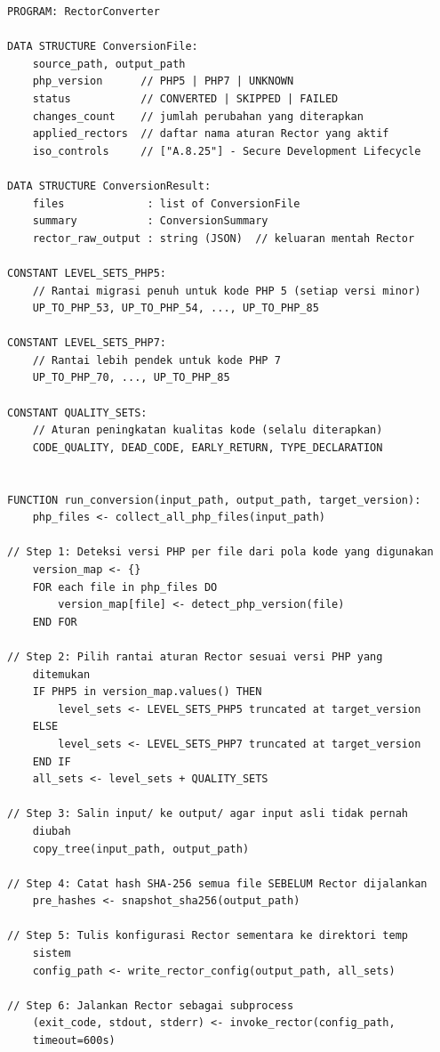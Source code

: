 \begin{lstlisting}[style=pseudocodestyle]
PROGRAM: RectorConverter

DATA STRUCTURE ConversionFile:
    source_path, output_path
    php_version      // PHP5 | PHP7 | UNKNOWN
    status           // CONVERTED | SKIPPED | FAILED
    changes_count    // jumlah perubahan yang diterapkan
    applied_rectors  // daftar nama aturan Rector yang aktif
    iso_controls     // ["A.8.25"] - Secure Development Lifecycle

DATA STRUCTURE ConversionResult:
    files             : list of ConversionFile
    summary           : ConversionSummary
    rector_raw_output : string (JSON)  // keluaran mentah Rector

CONSTANT LEVEL_SETS_PHP5:
    // Rantai migrasi penuh untuk kode PHP 5 (setiap versi minor)
    UP_TO_PHP_53, UP_TO_PHP_54, ..., UP_TO_PHP_85

CONSTANT LEVEL_SETS_PHP7:
    // Rantai lebih pendek untuk kode PHP 7
    UP_TO_PHP_70, ..., UP_TO_PHP_85

CONSTANT QUALITY_SETS:
    // Aturan peningkatan kualitas kode (selalu diterapkan)
    CODE_QUALITY, DEAD_CODE, EARLY_RETURN, TYPE_DECLARATION


FUNCTION run_conversion(input_path, output_path, target_version):
    php_files <- collect_all_php_files(input_path)

// Step 1: Deteksi versi PHP per file dari pola kode yang digunakan
    version_map <- {}
    FOR each file in php_files DO
        version_map[file] <- detect_php_version(file)
    END FOR

// Step 2: Pilih rantai aturan Rector sesuai versi PHP yang 
    ditemukan
    IF PHP5 in version_map.values() THEN
        level_sets <- LEVEL_SETS_PHP5 truncated at target_version
    ELSE
        level_sets <- LEVEL_SETS_PHP7 truncated at target_version
    END IF
    all_sets <- level_sets + QUALITY_SETS

// Step 3: Salin input/ ke output/ agar input asli tidak pernah 
    diubah
    copy_tree(input_path, output_path)

// Step 4: Catat hash SHA-256 semua file SEBELUM Rector dijalankan
    pre_hashes <- snapshot_sha256(output_path)

// Step 5: Tulis konfigurasi Rector sementara ke direktori temp 
    sistem
    config_path <- write_rector_config(output_path, all_sets)

// Step 6: Jalankan Rector sebagai subprocess
    (exit_code, stdout, stderr) <- invoke_rector(config_path, 
    timeout=600s)


\end{lstlisting}
